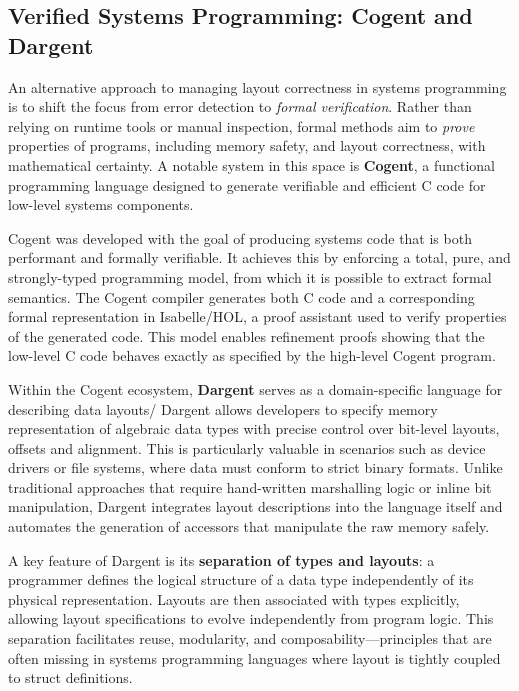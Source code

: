 \documentclass[12pt]{article}
\begin{document}
\subsection{Verified Systems Programming: Cogent and Dargent}
An alternative approach to managing layout correctness in systems
programming is to shift the focus from error detection to
\textit{formal verification}. Rather than relying on runtime
tools or manual inspection, formal methods aim to \textit{prove}
properties of programs, including memory safety, and layout correctness, with
mathematical certainty. A notable system in this space is \textbf{Cogent},
a functional programming language designed to generate verifiable and efficient
C code for low-level systems components.~\autocite{dargent}

Cogent was developed with the goal of producing systems code that
is both performant and formally verifiable. It achieves this by enforcing
a total, pure, and strongly-typed programming model, from which it is possible
to extract formal semantics. The Cogent compiler generates both C code and
a corresponding formal representation in Isabelle/HOL, a proof assistant
used to verify properties of the generated code. This model enables
refinement proofs showing that the low-level C code behaves exactly
as specified by the high-level Cogent program.

Within the Cogent ecosystem, \textbf{Dargent} serves as a domain-specific
language for describing data layouts/ Dargent allows developers to specify
memory representation of algebraic data types with precise control over 
bit-level layouts, offsets and alignment. This is particularly valuable
in scenarios such as device drivers or file systems, where data must
conform to strict binary formats. Unlike traditional approaches that require
hand-written marshalling logic or inline bit manipulation, Dargent integrates
layout descriptions into the language itself and automates the generation of
accessors that manipulate the raw memory safely.

A key feature of Dargent is its \textbf{separation of types and layouts}:
a programmer defines the logical structure of a data type independently of
its physical representation. Layouts are then associated with types explicitly,
allowing layout specifications to evolve independently from program logic.
This separation facilitates reuse, modularity, and composability---principles
that are often missing in systems programming languages where layout is
tightly coupled to struct definitions.
\end{document}
